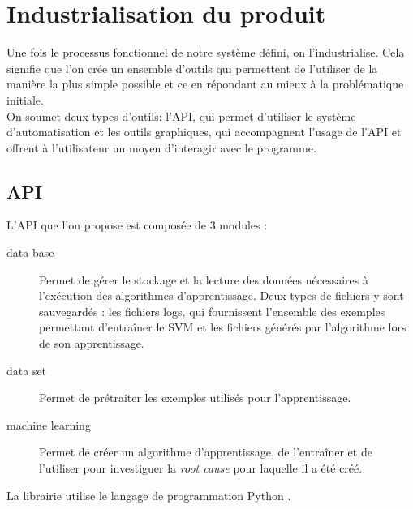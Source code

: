 \chapter{Industrialisation du produit}
\label{Industrialisation du produit}
\thispagestyle{fancy}
Une fois le processus fonctionnel de notre système défini, on l'industrialise. Cela signifie que l'on crée un ensemble d'outils qui permettent de l'utiliser de la manière la plus simple possible et ce en répondant au mieux à la problématique initiale. \\
On soumet deux types d'outils: l'API, qui permet d'utiliser le système d'automatisation et les outils graphiques, qui accompagnent l'usage de l'API et offrent à l'utilisateur un moyen d'interagir avec le programme.  

\section{API}
\label{Industrialisation du produit: API}
L'API que l'on propose est composée de 3 modules :
\begin{description}
	\item [data base] Permet de gérer le stockage et la lecture des données nécessaires à l'exécution des algorithmes d'apprentissage. Deux types de fichiers y sont sauvegardés : les fichiers logs, qui fournissent l'ensemble des exemples permettant d'entraîner le SVM et les fichiers générés par l'algorithme lors de son apprentissage.
	\item [data set] Permet de prétraiter les exemples utilisés pour l'apprentissage.
	\item [machine learning] Permet de créer un algorithme d'apprentissage, de l'entraîner et de l'utiliser pour investiguer la \emph{root cause} pour laquelle il a été créé.
\end{description}

La librairie utilise le langage de programmation Python \cite{Python}. \\

